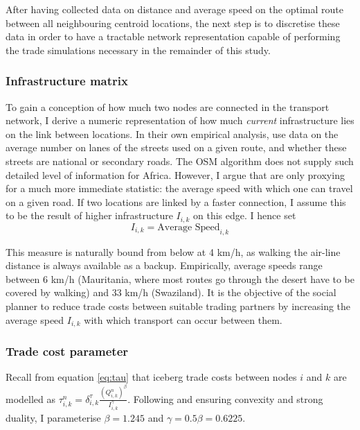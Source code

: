 \documentclass[11pt, oneside]{article}   	%
\begin{document}
After having collected data on distance and average speed on the optimal route between all neighbouring centroid locations, the next step is to discretise these data in order to have a tractable network representation capable of performing the trade simulations necessary in the remainder of this study.

\subsubsection{Infrastructure matrix }
To gain a conception of how much two nodes are connected in the transport network, I derive a numeric representation of how much \emph{current} infrastructure lies on the link between locations. In their own empirical analysis, \cite{fajgelbaum_optimal_2017} use data on the average number on lanes of the streets used on a given route, and whether these streets are national or secondary roads. The OSM algorithm does not supply such detailed level of information for Africa. However, I argue that \citeauthor{fajgelbaum_optimal_2017} are only proxying for a much more immediate statistic: the average speed with which one can travel on a given road. If two locations are linked by a faster connection, I assume this to be the result of higher infrastructure $I_{i,k}$ on this edge. I hence set
\begin{equation}
  I_{i,k} = \textrm{Average Speed}_{i,k}
\end{equation}

This measure is naturally bound from below at 4 km/h, as walking the air-line distance is always available as a backup. Empirically, average speeds range between 6 km/h (Mauritania, where most routes go through the desert have to be covered by walking) and 33 km/h (Swaziland). It is the objective of the social planner to reduce trade costs between suitable trading partners by increasing the average speed $I_{i,k}$ with which transport can occur between them.

\subsubsection{Trade cost parameter }
Recall from equation \eqref{eq:tau} that iceberg trade costs between nodes $i$ and $k$ are modelled as $\tau_{i,k}^{n} = \delta^{\tau}_{i, k} \frac{(Q_{i,k}^{n})^{\beta}}{I_{i,k}^{\gamma}}$. Following \citeauthor{fajgelbaum_optimal_2017} and ensuring convexity and strong duality, I parameterise $\beta = 1.245$ and $\gamma = 0.5\beta = 0.6225$.
\end{document}
